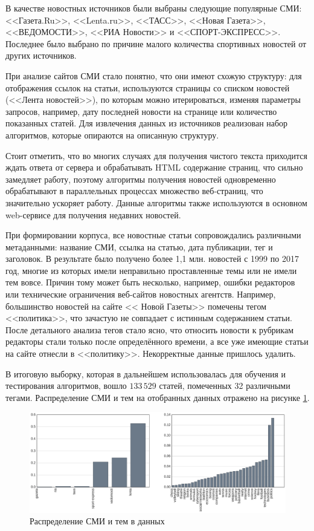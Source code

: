 \documentclass[a4paper, 14pt]{extarticle}
\begin{document}
В качестве новостных источников были выбраны следующие популярные СМИ:
<<Газета.Ru>>, <<Lenta.ru>>, <<ТАСС>>, <<Новая Газета>>, <<ВЕДОМОСТИ>>, <<РИА Новости>> и <<СПОРТ-ЭКСПРЕСС>>.
Последнее было выбрано по причине малого количества спортивных новостей от других источников.

При анализе сайтов СМИ стало понятно, что они имеют схожую структуру: для отображения ссылок на статьи,
используются страницы со списком новостей (<<Лента новостей>>), по которым можно итерироваться,
изменяя параметры запросов, например, дату последней новости на странице или количество показанных статей.
Для извлечения данных из источников реализован набор алгоритмов, которые опираются на описанную структуру.

Стоит отметить, что во многих случаях для получения чистого текста приходится ждать ответа от сервера и обрабатывать 
HTML содержание страниц, что сильно замедляет работу, поэтому алгоритмы получения новостей одновременно обрабатывают
в параллельных процессах множество веб-страниц, что значительно ускоряет работу. Данные алгоритмы также используются в основном
web-сервисе для получения недавних новостей.

При формировании корпуса, все новостные статьи сопровождались различными метаданными: название СМИ, ссылка на статью,
дата публикации, тег и заголовок. В результате было получено более 1,1 млн. новостей с 1999 по 2017 год, многие из 
которых имели неправильно проставленные темы или не имели тем вовсе. Причин тому может быть несколько, например,
ошибки редакторов или технические ограничения веб-сайтов новостных агентств. Например, большинство новостей на сайте <<
Новой Газеты>> помечены тегом <<политика>>, что зачастую не совпадает с истинным содержанием статьи. После детального анализа тегов 
стало ясно, что относить новости к рубрикам редакторы стали только после определённого времени, а все уже имеющие 
статьи на сайте отнесли в <<политику>>. Некорректные данные пришлось удалить.

В итоговую выборку, которая в дальнейшем использовалась для обучения и тестирования алгоритмов,
вошло $133\,529$ статей, помеченных 32 различными тегами. Распределение СМИ и тем на отобранных данных отражено на 
рисунке \ref{media_topic_distr}.
\begin{figure}[h!]
	\centering
	\includegraphics[width=1\textwidth]{media_topi_distr.pdf}
	\caption{Распределение СМИ и тем в данных}
	\label{media_topic_distr}
\end{figure}
\end{document}
